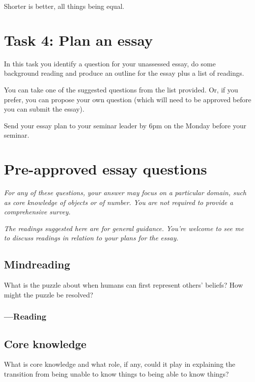 \documentclass[12pt,\papersize]{extarticle}
\begin{document}
Shorter is better, all things being equal.





\clearpage


\section{Task 4: Plan an essay}
In this task you identify a question for your unassessed essay, do some background reading and produce an outline for the essay plus a list of readings.

You can take one of the suggested questions from the list provided.  Or, if you prefer, you can propose your own question (which will need to be approved before you can submit the essay).

Send your essay plan to your seminar leader by 6pm on the Monday before your seminar.



\section{Pre-approved essay questions}

\textit{For any of these questions, your answer may focus on a particular domain, such as core knowledge of objects or of number.  You are not required to provide a comprehensive survey.}

\emph{The readings suggested here are for general guidance.  You’re welcome to see me to discuss readings in relation to your plans for the essay.}


\subsection{Mindreading}
What is the puzzle about when humans can first represent others’ beliefs?
How might the puzzle be resolved?

\subsubsection{---Reading}







\subsection{Core knowledge}
What is core knowledge and what role, if any, could it play in explaining the transition from being unable to know things to being able to know things?
\end{document}
